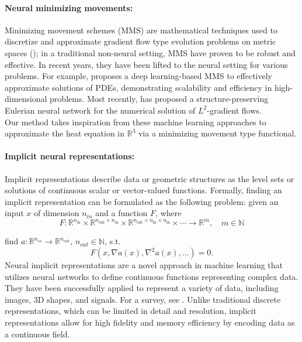 \documentclass[12pt,openany]{book}
\newcommand{\R}{\mathbb{R}}
\theoremstyle{plainnormal}
\theoremstyle{remark}
\begin{document}
\paragraph{Neural minimizing movements:}
Minimizing movement schemes (MMS) are mathematical techniques used to discretize and approximate gradient flow type evolution problems on metric spaces (\cite{de1993new}); in a traditional non-neural setting, MMS have proven to be robust and effective. In recent years, they have been lifted to the neural setting for various problems. For example, \cite{park2023deep} proposes a deep learning-based MMS to effectively approximate solutions of PDEs, demonstrating scalability and efficiency in high-dimensional problems. Most recently, \cite{hu2024energetic} has proposed a structure-preserving Eulerian neural network for the numerical solution of $L^2$-gradient flows.\\
Our method takes inspiration from these machine learning approaches to approximate the heat equation in $\R^3$ via a minimizing movement type functional.
\paragraph{Implicit neural representations:} 
Implicit representations describe data or geometric structures as the level sets or solutions of continuous scalar or vector-valued functions. Formally, finding an implicit representation can be formulated as the following problem: given an input $x$ of dimension $n_{in}$ and a function $F$, where
\[
F: \mathbb{R}^{n_{\text{in}}} \times \mathbb{R}^{n_{\text{out}} \times n_{\text{in}}} \times \mathbb{R}^{n_{\text{out}} \times n_{\text{in}} \times n_{\text{in}}} \times \cdots \rightarrow \mathbb{R}^m, \quad m \in \mathbb N
\]

find $a: \R^{n_{in}} \rightarrow \R^{n_{out}}$, $n_{{out}}\in \mathbb{N}$, s.t. $$F(x, \nabla a(x), \nabla^2a(x), \dots) = 0.$$ 
Neural implicit representations are a novel approach in machine learning that utilizes neural networks to define continuous functions representing complex data. They have been successfully applied to represent a variety of data, including images, 3D shapes, and signals. For a survey, see \cite{essakine2025standimplicitneuralrepresentations}. Unlike traditional discrete representations, which can be limited in detail and resolution, implicit representations allow for high fidelity and memory efficiency by encoding data as a continuous field.
  
\end{document}
